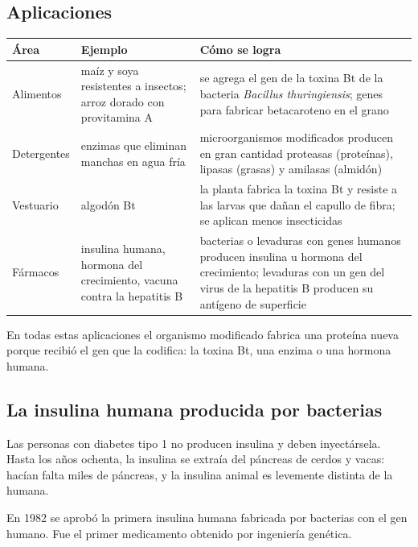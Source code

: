 \subsection{Aplicaciones}
\begin{center}\small
\begin{tabularx}{\linewidth}{@{}>{\raggedright\arraybackslash\hsize=0.45\hsize}X>{\raggedright\arraybackslash\hsize=1.28\hsize}X>{\raggedright\arraybackslash\hsize=1.28\hsize}X@{}}
\toprule
\textbf{Área} & \textbf{Ejemplo} & \textbf{Cómo se logra} \\
\midrule
Alimentos & maíz y soya resistentes a insectos; arroz dorado con provitamina A & se agrega el gen de la toxina Bt de la bacteria \emph{Bacillus thuringiensis}; genes para fabricar betacaroteno en el grano \\
Detergentes & enzimas que eliminan manchas en agua fría & microorganismos modificados producen en gran cantidad proteasas (proteínas), lipasas (grasas) y amilasas (almidón) \\
Vestuario & algodón Bt & la planta fabrica la toxina Bt y resiste a las larvas que dañan el capullo de fibra; se aplican menos insecticidas \\
Fármacos & insulina humana, hormona del crecimiento, vacuna contra la hepatitis B & bacterias o levaduras con genes humanos producen insulina u hormona del crecimiento; levaduras con un gen del virus de la hepatitis B producen su antígeno de superficie \\
\bottomrule
\end{tabularx}
\end{center}
 
\begin{clave}[{Recuerda}] En todas estas aplicaciones el organismo modificado fabrica una proteína nueva porque recibió el gen que la codifica: la toxina Bt, una enzima o una hormona humana.\end{clave}
\subsection{La insulina humana producida por bacterias}
Las personas con diabetes tipo 1 no producen insulina y deben inyectársela. Hasta los años ochenta, la insulina se extraía del páncreas de cerdos y vacas: hacían falta miles de páncreas, y la insulina animal es levemente distinta de la humana.

 

En 1982 se aprobó la primera insulina humana fabricada por bacterias con el gen humano. Fue el primer medicamento obtenido por ingeniería genética.

